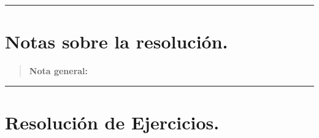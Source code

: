 \documentclass[12pt,letterpaper]{article}
\begin{document}
\bigskip
\hrule height 0.1pt
\bigskip

\section*{Notas sobre la resolución.}

\begin{quote}
  \textbf{Nota general:}
  
\end{quote}

\bigskip
\hrule height 0.1pt
\bigskip

\section*{Resolución de Ejercicios.}
\end{document}
